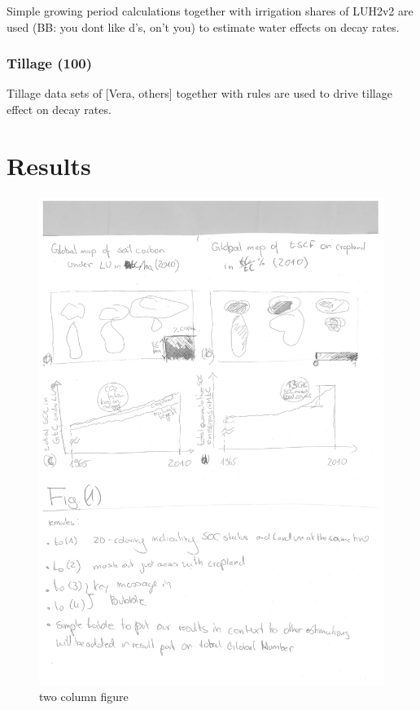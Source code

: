 \documentclass[gc, manuscript]{copernicus}
\begin{document}
Simple growing period calculations together with irrigation shares of
LUH2v2 are used (BB: you dont like d's, on't you) to estimate water
effects on decay rates.

\subsubsection{Tillage (100)}

Tillage data sets of {[}Vera, others{]} together with rules are used to
drive tillage effect on decay rates. \newpage

\section{Results}

\begin{figure}
\includegraphics[width=12cm]{images/figs_draft-1} \caption{two column figure}\label{fig:unnamed-chunk-6}
\end{figure}
\end{document}
